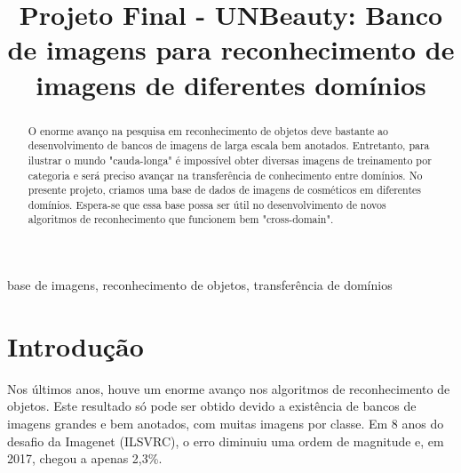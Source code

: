\documentclass[conference]{IEEEtran}
\begin{document}
\title{Projeto Final - UNBeauty: Banco de imagens para reconhecimento de imagens de diferentes domínios}

\author{
}

\maketitle

\begin{abstract}
O enorme avanço na pesquisa em reconhecimento de objetos deve bastante ao desenvolvimento de bancos de imagens de larga escala bem anotados. Entretanto, para ilustrar o mundo "cauda-longa" é impossível obter diversas imagens de treinamento por categoria e será preciso avançar na transferência de conhecimento entre domínios. No presente projeto, criamos uma base de dados de imagens de cosméticos em diferentes domínios.  Espera-se que essa base possa ser útil no desenvolvimento de novos algoritmos de reconhecimento que funcionem bem "cross-domain".
\end{abstract}

\begin{IEEEkeywords}
base de imagens, reconhecimento de objetos, transferência de domínios
\end{IEEEkeywords}

\section{Introdução}

Nos últimos anos, houve um enorme avanço nos algoritmos de reconhecimento de objetos\cite{horn}. Este resultado só pode ser obtido devido a existência de bancos de imagens grandes e bem anotados, com muitas imagens por classe\cite{fei, horn}. Em 8 anos do desafio da Imagenet (ILSVRC), o erro diminuiu uma ordem de magnitude\cite{fei} e, em 2017, chegou a apenas 2,3\%.
\end{document}
